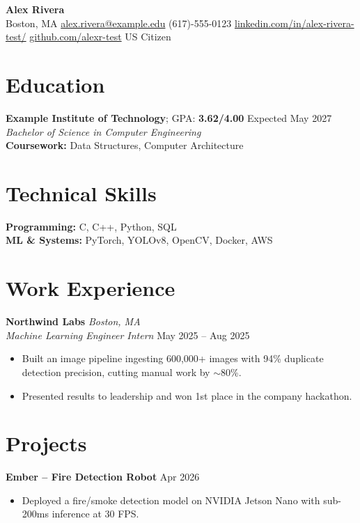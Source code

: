 \documentclass[a4paper,10pt]{article}
\begin{document}
\begin{center}
    {\LARGE \textbf{Alex Rivera}} \\[6pt]
    {\fontsize{9.2pt}{9.5pt}\selectfont
    Boston, MA \;\textbar\;
    \href{mailto:alex.r@example.edu}{alex.rivera@example.edu} \;\textbar\;
    (617)-555-0123 \;\textbar\;
    \href{https://www.linkedin.com/in/alex-rivera-test/}{linkedin.com/in/alex-rivera-test/} \;\textbar\;
    \href{https://github.com/alexr-test}{github.com/alexr-test} \;\textbar\;
    {US Citizen}
    }
\end{center}

\section*{Education}
\textbf{Example Institute of Technology}; GPA: \textbf{3.62/4.00} \hfill \textnormal{Expected May 2027} \\
\textit{Bachelor of Science in Computer Engineering} \\
\textbf{Coursework:} Data Structures, Computer Architecture

\section*{Technical Skills}
\textbf{Programming:} C, C++, Python, SQL \\
\textbf{ML \& Systems:} PyTorch, YOLOv8, OpenCV, Docker, AWS

\section*{Work Experience}
\textbf{Northwind Labs} \hfill \textit{Boston, MA} \\
\textit{Machine Learning Engineer Intern} \hfill \textnormal{May 2025 -- Aug 2025}
\begin{itemize}[leftmargin=2em, label={\small$\bullet$}]
    \item Built an image pipeline ingesting 600,000+ images with 94\% duplicate detection precision, cutting manual work by $\sim$80\%.
    \item Presented results to leadership and won 1st place in the company hackathon.
\end{itemize}

\section*{Projects}
\textbf{Ember -- Fire Detection Robot} \hfill \textnormal{Apr 2026}
\begin{itemize}[leftmargin=2em, label={\small$\bullet$}]
    \item Deployed a fire/smoke detection model on NVIDIA Jetson Nano with sub-200ms inference at 30 FPS.
\end{itemize}
\vspace*{-10em}
\end{document}
